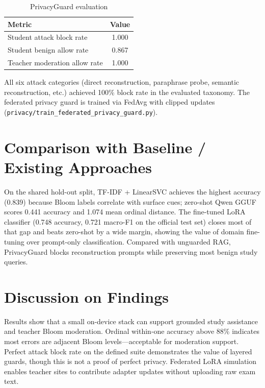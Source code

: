 \begin{table}[H]
\centering
\caption{PrivacyGuard evaluation}
\label{tab:privacy_results}
\renewcommand{\arraystretch}{1.2}
\begin{tabular}{|l|c|}
\hline
\textbf{Metric} & \textbf{Value} \\
\hline
Student attack block rate & 1.000 \\
\hline
Student benign allow rate & 0.867 \\
\hline
Teacher moderation allow rate & 1.000 \\
\hline
\end{tabular}
\end{table}

All six attack categories (direct reconstruction, paraphrase probe, semantic reconstruction, etc.) achieved 100\% block rate in the evaluated taxonomy. The federated privacy guard is trained via FedAvg with clipped updates (\texttt{privacy/train\_federated\_privacy\_guard.py}).

\section{Comparison with Baseline / Existing Approaches}
On the shared hold-out split, TF-IDF + LinearSVC achieves the highest accuracy (0.839) because Bloom labels correlate with surface cues; zero-shot Qwen GGUF scores 0.441 accuracy and 1.074 mean ordinal distance. The fine-tuned LoRA classifier (0.748 accuracy, 0.721 macro-F1 on the official test set) closes most of that gap and beats zero-shot by a wide margin, showing the value of domain fine-tuning over prompt-only classification. Compared with unguarded RAG, PrivacyGuard blocks reconstruction prompts while preserving most benign study queries.

\section{Discussion on Findings}
Results show that a small on-device stack can support grounded study assistance and teacher Bloom moderation. Ordinal within-one accuracy above 88\% indicates most errors are adjacent Bloom levels---acceptable for moderation support. Perfect attack block rate on the defined suite demonstrates the value of layered guards, though this is not a proof of perfect privacy. Federated LoRA simulation enables teacher sites to contribute adapter updates without uploading raw exam text.

